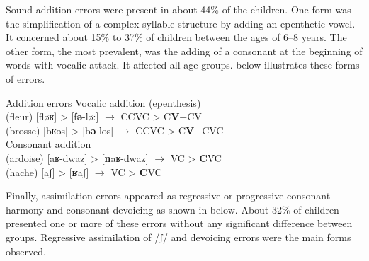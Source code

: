 \documentclass[output=paper,newtxmath,modfonts,nonflat,draftmode]{langsci/langscibook}
\begin{document}
Sound addition errors were present in about 44\% of the children. One form was the simplification of a complex syllable structure by adding an epenthetic vowel. It concerned about 15\% to 37\% of children between the ages of 6--8 years. The other form, the most prevalent, was the adding of a consonant at the beginning of words with vocalic attack. It affected all age groups.  below illustrates these forms of errors.

\ea Addition errors \label{ex:takam:addition_errors}
\ea Vocalic addition (epenthesis)\\
    (fleur) [fløʁ] > [f\textbf{ə}-lø:] $\rightarrow$ CCVC > C\textbf{V}+CV\\
    (brosse) [bʁos] > [b\textbf{ə}-los] $\rightarrow$ CCVC > C\textbf{V}+CVC\\
\ex Consonant addition\\
    (ardoise) [aʁ-dwaz] > [\textbf{n}aʁ-dwaz] $\rightarrow$ VC > \textbf{C}VC\\
(hache) [aʃ] > [\textbf{ʁ}aʃ] $\rightarrow$ VC > \textbf{C}VC\\
\z
\z

Finally, assimilation errors appeared as regressive or progressive consonant harmony and consonant devoicing as shown in  below. About 32\% of children presented one or more of these errors without any significant difference between groups. Regressive assimilation of /ʃ/ and devoicing errors were the main forms observed.
\end{document}

